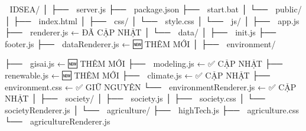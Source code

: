 📁 IDSEA/
│
├── 📄 server.js
├── 📄 package.json
├── 📄 start.bat
│
└── 📁 public/
    │
    ├── 📄 index.html
    │
    ├── 📁 css/
    │   └── 📄 style.css
    │
    └── 📁 js/
        │
        ├── 📄 app.js
        ├── 📄 renderer.js          ← ĐÃ CẬP NHẬT
        │
        └── 📁 data/
            │
            ├── 📄 init.js
            ├── 📄 footer.js
            ├── 📄 dataRenderer.js  ← 🆕 THÊM MỚI
            │
            ├── 📁 environment/
          
├── 📄 gisai.js              ← 🆕 THÊM MỚI
├── 📄 modeling.js           ← ✅ CẬP NHẬT
├── 📄 renewable.js          ← 🆕 THÊM MỚI
├── 📄 climate.js            ← ✅ CẬP NHẬT
├── 📄 environment.css       ← ✅ GIỮ NGUYÊN
└── 📄 environmentRenderer.js ← ✅ CẬP NHẬT
            │
            ├── 📁 society/
            │   ├── 📄 society.js
            │   ├── 📄 society.css
            │   └── 📄 societyRenderer.js
            │
            └── 📁 agriculture/
                ├── 📄 highTech.js
                ├── 📄 agriculture.css
                └── 📄 agricultureRenderer.js
